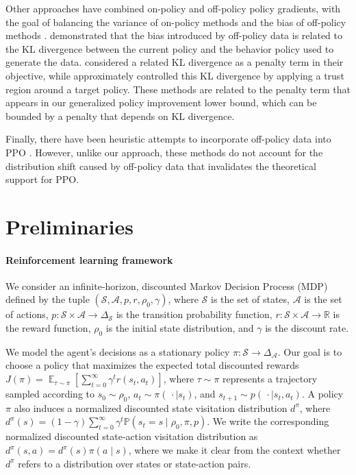 \documentclass{article}
\begin{document}
Other approaches have combined on-policy and off-policy policy gradients, with the goal of balancing the variance of on-policy methods and the bias of off-policy methods \citep{gu_2017_qprop, gu_2017_ipg, odonoghue_2017, wang_2017, fakoor_2020}. \citet{gu_2017_ipg} demonstrated that the bias introduced by off-policy data is related to the KL divergence between the current policy and the behavior policy used to generate the data. \citet{fakoor_2020} considered a related KL divergence as a penalty term in their objective, while \citet{wang_2017} approximately controlled this KL divergence by applying a trust region around a target policy. These methods are related to the penalty term that appears in our generalized policy improvement lower bound, which can be bounded by a penalty that depends on KL divergence.

Finally, there have been heuristic attempts to incorporate off-policy data into PPO \citep{sovrano_2019,holubar_2020}. However, unlike our approach, these methods do not account for the distribution shift caused by off-policy data that invalidates the theoretical support for PPO.


\section{Preliminaries}

\paragraph{Reinforcement learning framework}

We consider an infinite-horizon, discounted Markov Decision Process (MDP) defined by the tuple $(\mathcal{S},\mathcal{A},p,r,\rho_0,\gamma)$, where $\mathcal{S}$ is the set of states, $\mathcal{A}$ is the set of actions, $p: \mathcal{S} \times \mathcal{A} \rightarrow \Delta_{\mathcal{S}}$ is the transition probability function, $r: \mathcal{S} \times \mathcal{A} \rightarrow \mathbb{R}$ is the reward function, $\rho_0$ is the initial state distribution, and $\gamma$ is the discount rate.

We model the agent's decisions as a stationary policy $\pi: \mathcal{S} \rightarrow \Delta_{\mathcal{A}}$. Our goal is to choose a policy that maximizes the expected total discounted rewards $J(\pi) = \mathop{\mathbb{E}}_{\tau \sim \pi} \left[ \sum_{t=0}^{\infty} \gamma^t r(s_t,a_t) \right]$, where $\tau \sim \pi$ represents a trajectory sampled according to $s_0 \sim \rho_0$, $a_t \sim \pi(\, \cdot \mid s_t)$, and $s_{t+1} \sim p(\, \cdot \mid s_t,a_t)$. A policy $\pi$ also induces a normalized discounted state visitation distribution $d^{\pi}$, where $d^{\pi}(s) = (1-\gamma) \sum_{t=0}^{\infty} \gamma^t \mathbb{P}(s_t = s \mid \rho_0, \pi, p)$. We write the corresponding normalized discounted state-action visitation distribution as $d^{\pi}(s,a) = d^{\pi}(s) \pi(a \mid s)$, where we make it clear from the context whether $d^{\pi}$ refers to a distribution over states or state-action pairs.
\end{document}
